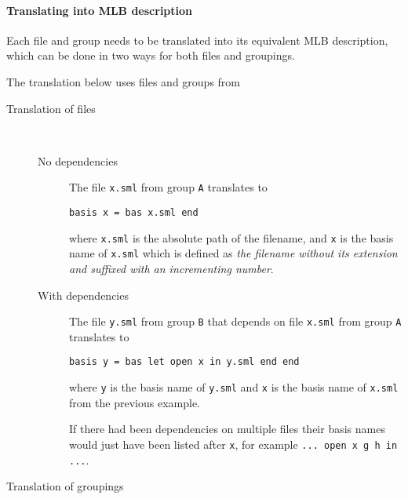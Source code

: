 \paragraph{Translating into MLB description}

Each file and group needs to be translated into its equivalent MLB
description, which can be done in two ways for both files and groupings.

The translation below uses files and groups from

\begin{description}
  
\item[Translation of files] \
  
  \begin{description}
    
  \item[No dependencies]
    
    The file \texttt{x.sml} from group \texttt{A} translates to
    
\begin{lstlisting}
basis x = bas x.sml end      
\end{lstlisting}
    
    where \texttt{x.sml} is the absolute path of the filename, and \texttt{x} is
    the basis name of \texttt{x.sml} which is defined as \textit{the filename
      without its extension and suffixed with an incrementing number}.
        
  \item[With dependencies]
    
    The file \texttt{y.sml} from group \texttt{B} that depends on file
    \texttt{x.sml} from group \texttt{A} translates to
    
\begin{lstlisting}
basis y = bas let open x in y.sml end end
\end{lstlisting}
    
    where \texttt{y} is the basis name of \texttt{y.sml} and \texttt{x} is the
    basis name of \texttt{x.sml} from the previous example.
    
    If there had been dependencies on multiple files their basis names would
    just have been listed after \texttt{x}, for example \texttt{... open x g h
      in ...}.
    
  \end{description}
  
\item[Translation of groupings]
  

\end{description}
